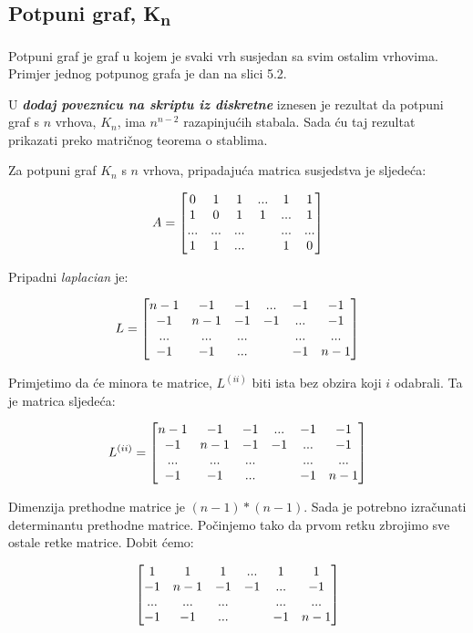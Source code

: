 \documentclass[times, utf8, zavrsni]{fer}
\begin{document}
\subsection{Potpuni graf, K\textsubscript{n}}

Potpuni graf je graf u kojem je svaki vrh susjedan sa svim ostalim vrhovima. Primjer jednog potpunog grafa je dan na slici 5.2.

U \textbf{\textit{dodaj poveznicu na skriptu iz diskretne}} iznesen je rezultat da potpuni graf s $n$ vrhova, $K_n$, ima $n^{n-2}$ razapinjućih stabala. Sada ću taj rezultat prikazati preko matričnog teorema o stablima.

Za potpuni graf $K_n$ s $n$ vrhova, pripadajuća matrica susjedstva je sljedeća:

\[
\centering
A = 
\begin{bmatrix}
	0 & 1 & 1 & ... & 1 & 1 \\
	1 & 0 & 1 & 1 & ... & 1 \\
	... & ... & ... & & ... & ...  \\
	1 & 1 & ... & & 1 & 0
\end{bmatrix}
\]

Pripadni \textit{laplacian} je:

\[
\centering
L = 
\begin{bmatrix}
	n-1 & -1 & -1 & ... & -1 & -1 \\
	-1 & n-1 & -1 & -1 & ... & -1 \\
	... & ... & ... & & ... & ...  \\
	-1 & -1 & ... & & -1 & n-1
\end{bmatrix}
\]

Primjetimo da će minora te matrice, $L^{(ii)}$ biti ista bez obzira koji $i$ odabrali. Ta je matrica sljedeća:

\[
\centering
L^{(ii)} = 
\begin{bmatrix}
	n-1 & -1 & -1 & ... & -1 & -1 \\
	-1 & n-1 & -1 & -1 & ... & -1 \\
	... & ... & ... & & ... & ...  \\
	-1 & -1 & ... & & -1 & n-1
\end{bmatrix}
\]

Dimenzija prethodne matrice je $(n-1)*(n-1)$. Sada je potrebno izračunati determinantu prethodne matrice. Počinjemo tako da prvom retku zbrojimo sve ostale retke matrice. Dobit ćemo:

\[
\centering
\begin{bmatrix}
	1 & 1 & 1 & ... & 1 & 1 \\
	-1 & n-1 & -1 & -1 & ... & -1 \\
	... & ... & ... & & ... & ...  \\
	-1 & -1 & ... & & -1 & n-1
\end{bmatrix}
\]
\end{document}

